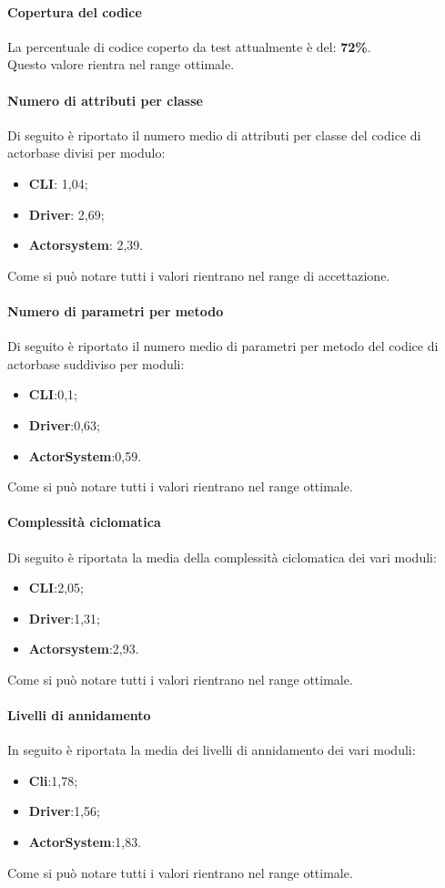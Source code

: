 \documentclass{scalatekids-article}
\begin{document}
\paragraph{Copertura del codice}
La percentuale di codice coperto da test attualmente è del: \textbf{72\%}.\\
Questo valore rientra nel range ottimale.

\paragraph{Numero di attributi per classe}
Di seguito è riportato il numero medio di attributi per classe del codice di actorbase divisi per modulo:
\begin{itemize}
	\item \textbf{CLI}: 1,04;
	\item \textbf{Driver}: 2,69;
	\item \textbf{Actorsystem}: 2,39.
\end{itemize}
Come si può notare tutti i valori rientrano nel range di accettazione.

\paragraph{Numero di parametri per metodo}
Di seguito è riportato il numero medio di parametri per
metodo del codice di actorbase suddiviso per moduli:
\begin{itemize}
	\item \textbf{CLI}:0,1;
	\item \textbf{Driver}:0,63;
	\item \textbf{ActorSystem}:0,59.
\end{itemize}
Come si può notare tutti i valori rientrano nel range ottimale.


\paragraph{Complessità ciclomatica}
Di seguito è riportata la media della complessità ciclomatica dei vari moduli:
\begin{itemize}
	\item \textbf{CLI}:2,05;
	\item \textbf{Driver}:1,31;
	\item \textbf{Actorsystem}:2,93.
\end{itemize}
Come si può notare tutti i valori rientrano nel range ottimale.

\paragraph{Livelli di annidamento}
In seguito è riportata la media dei livelli di annidamento dei vari moduli:
\begin{itemize}
	\item \textbf{Cli}:1,78;
	\item \textbf{Driver}:1,56;
	\item \textbf{ActorSystem}:1,83.
\end{itemize}
Come si può notare tutti i valori rientrano nel range ottimale.
\end{document}
